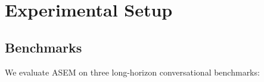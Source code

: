 \documentclass{article}
\newtheorem{proposition}{Proposition}[section]
\newcommand{\note}{m}
\newcommand{\ours}{\textsc{ASEM}\xspace}
\begin{document}




\section{Experimental Setup}
\label{sec:experiments}

\subsection{Benchmarks}

We evaluate \ours on three long-horizon conversational benchmarks:
\end{document}
